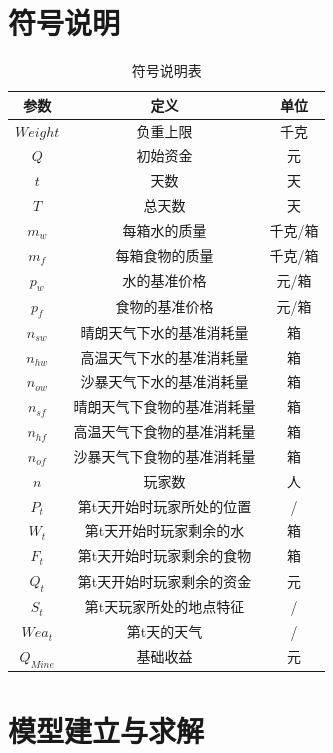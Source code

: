 \documentclass[withoutpre]{cumcmthesis} %
\begin{document}
\section{符号说明}
\begin{table}[H]
    \caption{符号说明表}\label{tab:001} \centering
    \begin{tabular}{ccc}
        \toprule[1.5pt]
        \textbf{参数} & \textbf{定义} & \textbf{单位}\\
        \midrule[1pt]
        $Weight$ & 负重上限 & 千克\\ 
        $Q$ & 初始资金 & 元 \\
        $t$ & 天数 & 天\\
        $T$ & 总天数 & 天\\
        $m_w$ & 每箱水的质量 & 千克/箱\\
        $m_f$ & 每箱食物的质量 & 千克/箱 \\
        $p_w$ & 水的基准价格 & 元/箱\\
        $p_f$ & 食物的基准价格 & 元/箱\\
        $n_{sw}$ & 晴朗天气下水的基准消耗量 & 箱\\
        $n_{hw}$ & 高温天气下水的基准消耗量 & 箱\\
        $n_{ow}$ & 沙暴天气下水的基准消耗量 & 箱\\
        $n_{sf}$ & 晴朗天气下食物的基准消耗量 & 箱\\
        $n_{hf}$ & 高温天气下食物的基准消耗量 & 箱\\
        $n_{of}$ & 沙暴天气下食物的基准消耗量 & 箱\\
        $n$ & 玩家数 & 人 \\
        $P_{t}$ & 第t天开始时玩家所处的位置 & / \\
        $W_{t}$ & 第t天开始时玩家剩余的水 & 箱 \\
        $F_{t}$ & 第t天开始时玩家剩余的食物 & 箱 \\ 
        $Q_{t}$ & 第t天开始时玩家剩余的资金 & 元 \\
        $S_{t}$ & 第t天玩家所处的地点特征 & /\\
        $Wea_t$ & 第t天的天气 & /\\
        $Q_{Mine}$ & 基础收益 & 元\\
        
        \bottomrule[1.5pt]
    \end{tabular}
\end{table}


\section{模型建立与求解}
\end{document}
